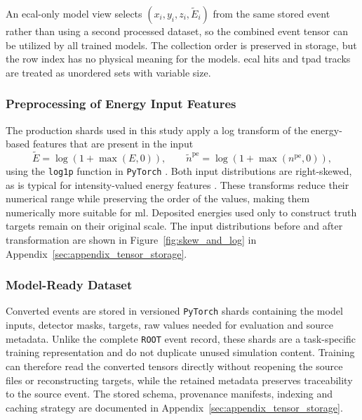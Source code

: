 An \gls{ecal}-only model view selects
\((x_i,y_i,z_i,\widetilde{E}_i)\) from the same stored event rather than
using a second processed dataset, so the combined event tensor can be utilized by all trained models. The collection order is preserved in
storage, but the row index has no physical meaning for the models. \gls{ecal} hits
and \gls{tpad} tracks are treated as unordered sets with variable size.

\subsubsection{Preprocessing of Energy Input Features}
\label{sec:preprocess}

The production shards used in this study apply a log transform of the energy-based features that are present in the input
\begin{equation}
    \widetilde{E}
    = \log\!\left(1+\max(E,0)\right),
    \qquad
    \widetilde{n}^{\mathrm{pe}}
    = \log\!\left(1+\max(n^{\mathrm{pe}},0)\right),
    \label{eq:input_log_transforms}
\end{equation}
using the \texttt{log1p} function in \texttt{PyTorch}
\cite{pytorch_log1p}. Both input distributions are right-skewed, as is typical
for intensity-valued energy features \cite{lai2024shower}. These
transforms reduce their numerical range while preserving the order of the
values, making them numerically more suitable for \gls{ml}. Deposited energies
used only to construct truth targets remain on their original scale. The input
distributions before and after transformation are shown in
Figure~\ref{fig:skew_and_log} in
Appendix~\ref{sec:appendix_tensor_storage}.

\subsubsection{Model-Ready Dataset}

Converted events are stored in versioned \texttt{PyTorch} shards containing
the model inputs, detector masks, targets, raw values needed for evaluation
and source metadata. Unlike the complete \texttt{ROOT} event record, these
shards are a task-specific training representation and do not duplicate
unused simulation content. Training can therefore read the converted tensors
directly without reopening the source files or reconstructing targets, while
the retained metadata preserves traceability to the source event. The stored
schema, provenance manifests, indexing and caching strategy are documented in
Appendix~\ref{sec:appendix_tensor_storage}.


